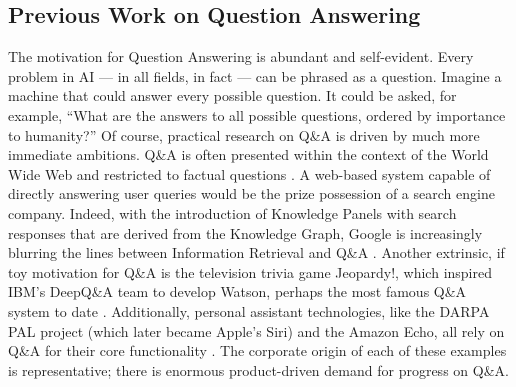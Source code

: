 \subsection{Previous Work on Question Answering}

The motivation for Question Answering is abundant and self-evident. Every problem in AI --- in all fields, in fact --- can be phrased as a question. Imagine a machine that could answer every possible question. It could be asked, for example, ``What are the answers to all possible questions, ordered by importance to humanity?'' Of course, practical research on Q\&A is driven by much more immediate ambitions. Q\&A is often presented within the context of the World Wide Web and restricted to factual questions  \citep{cucerzan2005factoid, ravichandran2002learning, kwok2001scaling}. A web-based system capable of directly answering user queries would be the prize possession of a search engine company. Indeed, with the introduction of Knowledge Panels with search responses that are derived from the Knowledge Graph, Google is increasingly blurring the lines between Information Retrieval and Q\&A  \citep{singhal2012introducing}. Another extrinsic, if toy motivation for Q\&A is the television trivia game Jeopardy!, which inspired IBM's DeepQ\&A team to develop Watson, perhaps the most famous Q\&A system to date  \citep{ferrucci2012introduction}. Additionally, personal assistant technologies, like the DARPA PAL project (which later became Apple's Siri) and the Amazon Echo, all rely on Q\&A for their core functionality  \citep{aron2011innovative, tsiao2007natural}. The corporate origin of each of these examples is representative; there is enormous product-driven demand for progress on Q\&A.

